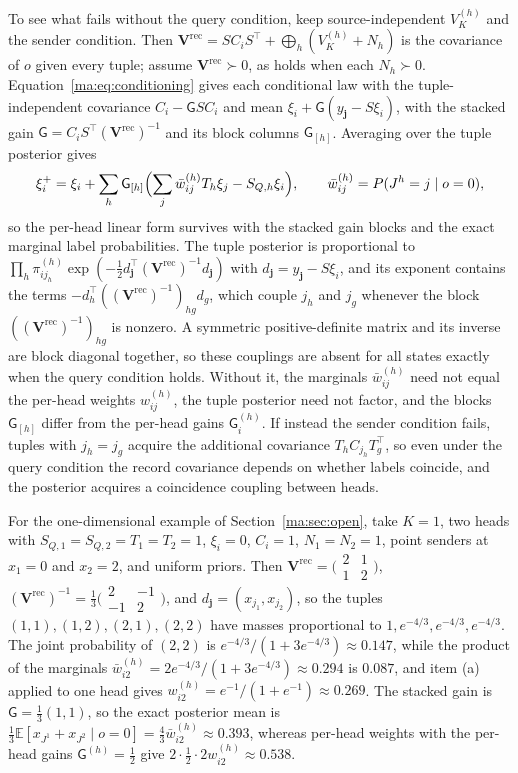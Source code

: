 \documentclass[11pt]{article}
\theoremstyle{definition}
\theoremstyle{remark}
\newcommand{\E}{\mathbb E}
\newcommand{\Vrecb}{\mathbf V^{\mathrm{rec}}}
\newcommand{\G}{\mathsf G}
\begin{document}
To see what fails without the query condition, keep source-independent $V^{(h)}_K$ and the sender condition. Then $\Vrecb=SC_iS^\top+\bigoplus_h(V^{(h)}_K+N_h)$ is the covariance of $o$ given every tuple; assume $\Vrecb\succ0$, as holds when each $N_h\succ0$. Equation~\eqref{ma:eq:conditioning} gives each conditional law with the tuple-independent covariance $C_i-\G SC_i$ and mean $\xi_i+\G(y_{\mathbf j}-S\xi_i)$, with the stacked gain $\G=C_iS^\top(\Vrecb)^{-1}$ and its block columns $\G_{[h]}$. Averaging over the tuple posterior gives
\begin{equation}
\xi_i^+=\xi_i+\sum_h\G_{[h]}\Bigl(\sum_j\bar w^{(h)}_{ij}T_h\xi_j-S_{Q,h}\xi_i\Bigr),\qquad
\bar w^{(h)}_{ij}=P(J^h=j\mid o=0),
\label{ma:eq:stacked_mean}
\end{equation}
so the per-head linear form survives with the stacked gain blocks and the exact marginal label probabilities. The tuple posterior is proportional to $\prod_h\pi^{(h)}_{ij_h}\exp(-\frac12d_{\mathbf j}^\top(\Vrecb)^{-1}d_{\mathbf j})$ with $d_{\mathbf j}=y_{\mathbf j}-S\xi_i$, and its exponent contains the terms $-d_h^\top((\Vrecb)^{-1})_{hg}d_g$, which couple $j_h$ and $j_g$ whenever the block $((\Vrecb)^{-1})_{hg}$ is nonzero. A symmetric positive-definite matrix and its inverse are block diagonal together, so these couplings are absent for all states exactly when the query condition holds. Without it, the marginals $\bar w^{(h)}_{ij}$ need not equal the per-head weights $w^{(h)}_{ij}$, the tuple posterior need not factor, and the blocks $\G_{[h]}$ differ from the per-head gains $\G^{(h)}_i$. If instead the sender condition fails, tuples with $j_h=j_g$ acquire the additional covariance $T_hC_{j_h}T_g^\top$, so even under the query condition the record covariance depends on whether labels coincide, and the posterior acquires a coincidence coupling between heads.

For the one-dimensional example of Section~\ref{ma:sec:open}, take $K=1$, two heads with $S_{Q,1}=S_{Q,2}=T_1=T_2=1$, $\xi_i=0$, $C_i=1$, $N_1=N_2=1$, point senders at $x_1=0$ and $x_2=2$, and uniform priors. Then $\Vrecb=\bigl(\begin{smallmatrix}2&1\\1&2\end{smallmatrix}\bigr)$, $(\Vrecb)^{-1}=\frac13\bigl(\begin{smallmatrix}2&-1\\-1&2\end{smallmatrix}\bigr)$, and $d_{\mathbf j}=(x_{j_1},x_{j_2})$, so the tuples $(1,1),(1,2),(2,1),(2,2)$ have masses proportional to $1,e^{-4/3},e^{-4/3},e^{-4/3}$. The joint probability of $(2,2)$ is $e^{-4/3}/(1+3e^{-4/3})\approx0.147$, while the product of the marginals $\bar w^{(h)}_{i2}=2e^{-4/3}/(1+3e^{-4/3})\approx0.294$ is $0.087$, and item (a) applied to one head gives $w^{(h)}_{i2}=e^{-1}/(1+e^{-1})\approx0.269$. The stacked gain is $\G=\frac13(1,1)$, so the exact posterior mean is $\frac13\E[x_{J^1}+x_{J^2}\mid o=0]=\frac43\bar w^{(h)}_{i2}\approx0.393$, whereas per-head weights with the per-head gains $\G^{(h)}=\frac12$ give $2\cdot\frac12\cdot2w^{(h)}_{i2}\approx0.538$.
\end{document}
